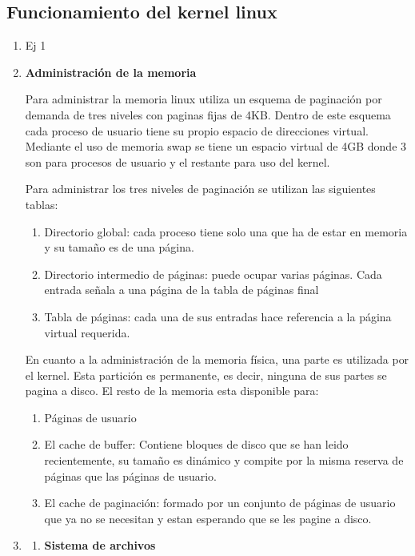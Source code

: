 \documentclass[a4paper,11pt] {article}
\begin{document}
\subsection*{Funcionamiento del kernel linux}

\begin{enumerate}
	\item Ej 1

	\item \textbf{Administraci\'on de la memoria}

	Para administrar la memoria linux utiliza un esquema de paginaci\'on por demanda de tres niveles con paginas fijas de 4KB. Dentro de este esquema cada proceso de usuario tiene su propio espacio de direcciones virtual. Mediante el uso de memoria swap se tiene un espacio virtual de 4GB donde 3 son para procesos de usuario y el restante para uso del kernel.
	
	Para administrar los tres niveles de paginaci\'on se utilizan las siguientes tablas:
		\begin{enumerate}
		\item Directorio global: cada proceso tiene solo una que ha de estar en memoria y su tamaño es de una p\'agina.
		\item Directorio intermedio de p\'aginas: puede ocupar varias p\'aginas. Cada entrada señala a una p\'agina de la tabla de p\'aginas final
		\item Tabla de p\'aginas: cada una de sus entradas hace referencia a la p\'agina virtual requerida.
		\end{enumerate}
	En cuanto a la administraci\'on de la memoria f\'isica, una parte es utilizada por el kernel. Esta partici\'on es permanente, es decir, ninguna de sus partes se pagina a disco.
	El resto de la memoria esta disponible para:
		\begin{enumerate}
		\item P\'aginas de usuario
		\item El cache de buffer: Contiene bloques de disco que se han leido recientemente, su tamaño es din\'amico y compite por la misma reserva de p\'aginas que las p\'aginas de usuario.
		\item El cache de paginaci\'on: formado por un conjunto de p\'aginas de usuario que ya no se necesitan y estan esperando que se les pagine a disco.
		\end{enumerate}

	\item 
		\begin{enumerate}
			\item \textbf{Sistema de archivos} 


\end{enumerate}
\end{enumerate}
\end{document}

